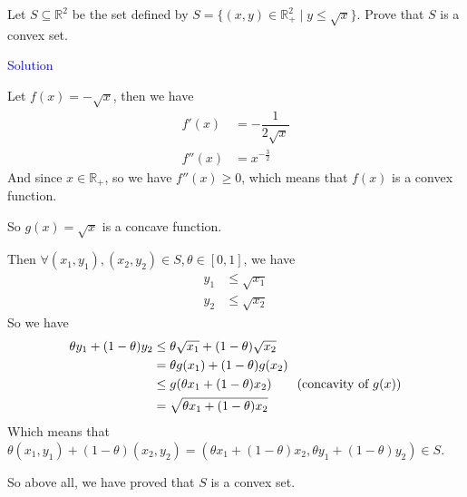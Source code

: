 Let $S \subseteq \mathbb{R}^2$ be the set defined by $S = \{(x, y) \in \mathbb{R}_+^2 \mid y \leq \sqrt{x}\}$. Prove that $S$ is a convex set. 

\textcolor{blue}{Solution}

Let $f(x)=-\sqrt{x}$, then we have
\begin{align*}
f'(x) &= -\dfrac{1}{2\sqrt{x}} \\
f''(x) &= x^{-\frac{3}{2}}
\end{align*}
And since $x\in \mathbb{R}_+$, so we have $f''(x) \geq 0$, which means that $f(x)$ is a convex function.

So $g(x)=\sqrt{x}$ is a concave function.

Then $\forall (x_1, y_1), (x_2, y_2) \in S, \theta\in[0,1]$, we have
\begin{align*}
y_1 &\leq \sqrt{x_1} \\
y_2 &\leq \sqrt{x_2}
\end{align*}
So we have
\begin{align*}
\theta y_1 + (1-\theta)y_2 &\leq \theta\sqrt{x_1} + (1-\theta)\sqrt{x_2} \\
&= \theta g(x_1) + (1-\theta)g(x_2) \\
&\leq g(\theta x_1 + (1-\theta)x_2) \text{\quad\quad (concavity of $g(x)$)} \\
&= \sqrt{\theta x_1 + (1-\theta)x_2}
\end{align*}
Which means that $\theta(x_1, y_1) + (1-\theta)(x_2, y_2) = \left(\theta x_1 + (1-\theta)x_2, \theta y_1 + (1-\theta)y_2\right) \in S$.

So above all, we have proved that $S$ is a convex set.

\newpage